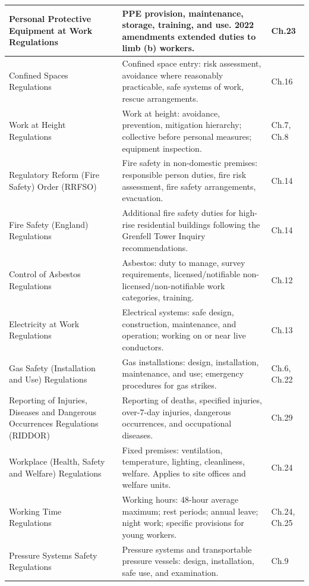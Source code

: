 \begin{table}[H]
\begin{tabularx}{\textwidth}{>{\raggedright\arraybackslash}p{4.8cm}>{\centering\arraybackslash}p{0.9cm}>{\raggedright\arraybackslash}p{4.2cm}>{\raggedright\arraybackslash}X}
\midrule
Personal Protective Equipment at Work Regulations & 2022 & PPE provision, maintenance, storage, training, and use. 2022 amendments extended duties to limb (b) workers. & Ch.23 \\
\midrule
Confined Spaces Regulations & 1997 & Confined space entry: risk assessment, avoidance where reasonably practicable, safe systems of work, rescue arrangements. & Ch.16 \\
\midrule
Work at Height Regulations & 2005 & Work at height: avoidance, prevention, mitigation hierarchy; collective before personal measures; equipment inspection. & Ch.7, Ch.8 \\
\midrule
Regulatory Reform (Fire Safety) Order (RRFSO) & 2005 & Fire safety in non-domestic premises: responsible person duties, fire risk assessment, fire safety arrangements, evacuation. & Ch.14 \\
\midrule
Fire Safety (England) Regulations & 2022 & Additional fire safety duties for high-rise residential buildings following the Grenfell Tower Inquiry recommendations. & Ch.14 \\
\midrule
Control of Asbestos Regulations & 2012 & Asbestos: duty to manage, survey requirements, licensed/notifiable non-licensed/non-notifiable work categories, training. & Ch.12 \\
\midrule
Electricity at Work Regulations & 1989 & Electrical systems: safe design, construction, maintenance, and operation; working on or near live conductors. & Ch.13 \\
\midrule
Gas Safety (Installation and Use) Regulations & 1998 & Gas installations: design, installation, maintenance, and use; emergency procedures for gas strikes. & Ch.6, Ch.22 \\
\midrule
Reporting of Injuries, Diseases and Dangerous Occurrences Regulations (RIDDOR) & 2013 & Reporting of deaths, specified injuries, over-7-day injuries, dangerous occurrences, and occupational diseases. & Ch.29 \\
\midrule
Workplace (Health, Safety and Welfare) Regulations & 1992 & Fixed premises: ventilation, temperature, lighting, cleanliness, welfare. Applies to site offices and welfare units. & Ch.24 \\
\midrule
Working Time Regulations & 1998 & Working hours: 48-hour average maximum; rest periods; annual leave; night work; specific provisions for young workers. & Ch.24, Ch.25 \\
\midrule
Pressure Systems Safety Regulations & 2000 & Pressure systems and transportable pressure vessels: design, installation, safe use, and examination. & Ch.9 \\

\end{tabularx}
\end{table}
